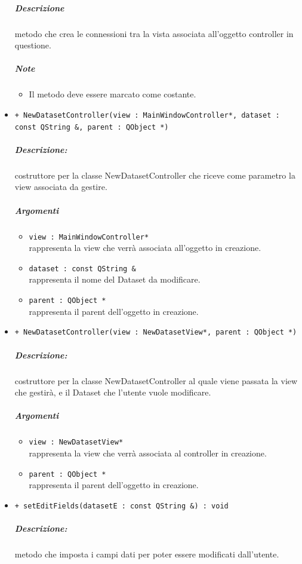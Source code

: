 \begin{itemize}
			\color{black}
			\subparagraph{Descrizione} metodo che crea le connessioni tra la vista associata all'oggetto controller in questione.
			\subparagraph{Note}
			\begin{itemize}
				\item Il metodo deve essere marcato come costante.
			\end{itemize}
			\item \color{blue} \verb!+ NewDatasetController(view : MainWindowController*, dataset : const QString &, parent : QObject *)!
			\color{black}
			\subparagraph{Descrizione:} costruttore per la classe NewDatasetController che riceve come parametro la view associata da gestire.
			\color{black}
			\subparagraph{Argomenti}
			\begin{itemize}
				\item \color{RoyalPurple} \verb!view : MainWindowController*!\\				
\color{black} rappresenta la view che verrà associata all'oggetto in creazione.
				\item \color{RoyalPurple} \verb!dataset : const QString &!\\				
\color{black} rappresenta il nome del Dataset\g{} da modificare.
				\item \color{RoyalPurple} \verb!parent : QObject *!\\				
\color{black} rappresenta il parent dell'oggetto in creazione.
			\end{itemize}
			\item \color{blue} \verb!+ NewDatasetController(view : NewDatasetView*, parent : QObject *)!
			\color{black}
			\subparagraph{Descrizione:} costruttore per la classe NewDatasetController al quale viene passata la view che gestirà, e il Dataset\g{} che l'utente vuole modificare.
			\color{black}
			\subparagraph{Argomenti}
			\begin{itemize}
				\item \color{RoyalPurple} \verb!view : NewDatasetView*!\\				
\color{black} rappresenta la view che verrà associata al controller in creazione.
				\item \color{RoyalPurple} \verb!parent : QObject *!\\				
\color{black} rappresenta il parent dell'oggetto in creazione.
			\end{itemize}
			\item \color{blue} \verb!+ setEditFields(datasetE : const QString &) : void!
			\color{black}
			\subparagraph{Descrizione:} metodo che imposta i campi dati per poter essere modificati dall'utente.

\end{itemize}
